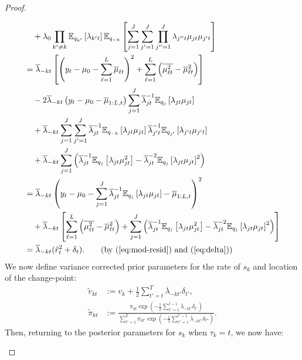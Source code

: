 \begin{proof}
\begin{enumerate}[label=\roman*.]
\begin{align*}
    &\quad + \lambda_0 \prod_{k' \neq k} \E_{q_{k'}}\left[ \lambda_{k't}\right]\E_{q_{-k}}\left[\sum_{j=1}^J\sum_{j'=1}^J  \prod_{j''=1}^J \lambda_{j''t} \mu_{jt} \mu_{j't}\right] \\
    &= \overline{\lambda}_{-kt}\left[\left(y_t - \mu_0 - \sum_{\ell=1}^L \overline{\mu}_{\ell t}\right)^2 + \sum_{\ell=1}^L \left(\overline{\mu^2_{\ell t}} - \overline{\mu}^2_{\ell t} \right) \right] \\
    &\quad -2  \overline{\lambda}_{-kt}\left(y_t - \mu_0  - \overline{\mu}_{1:L, t}\right) \sum_{j=1}^J \overline{\lambda}_{jt}^{-1} \E_{q_{j}}\left[\lambda_{jt} \mu_{jt}\right] \\
    &\quad + \overline{\lambda}_{-kt} \sum_{j=1}^J\sum_{j'=1}^J \overline{\lambda}_{jt}^{-1}\E_{q_{-k}}\left[\lambda_{jt} \mu_{jt}\right]\overline{\lambda}_{j't}^{-1}\E_{q_{j'}}\left[ \lambda_{j't}\mu_{j't}\right] \\
    &\quad + \overline{\lambda}_{-kt} \sum_{j=1}^J\left(\overline{\lambda}_{jt}^{-1}\E_{q_{j}}\left[ \lambda_{jt}\mu_{jt}^2\right] -\overline{\lambda}_{jt}^{-2}\E_{q_{j}}\left[ \lambda_{jt}\mu_{jt}\right]^2\right) \\
    &=  \overline{\lambda}_{-kt}\left(y_t - \mu_0 - \sum_{j=1}^J \overline{\lambda}_{jt}^{-1} \E_{q_{j}}\left[\lambda_{jt} \mu_{jt}\right] - \overline{\mu}_{1:L, t}\right)^2 \\
    &\quad + \overline{\lambda}_{-kt}\left[\sum_{\ell=1}^L \left(\overline{\mu^2_{\ell t}} - \overline{\mu}^2_{\ell t} \right) + \sum_{j=1}^J\left(\overline{\lambda}_{jt}^{-1}\E_{q_{j}}\left[ \lambda_{jt}\mu_{jt}^2\right] -\overline{\lambda}_{jt}^{-2}\E_{q_{j}}\left[ \lambda_{jt}\mu_{jt}\right]^2\right)\right] \\
    &= \overline{\lambda}_{-kt}(\tilde{r}^2_t + \delta_t). \tag{by (\ref{eq:mod-resid}) and (\ref{eq:delta})} 
\end{align*}
\normalsize
We now define variance corrected prior parameters for the rate of $s_{k}$ and location of the change-point:
\begin{align}
    \tilde{v}_{kt} &:= v_k + \frac{1}{2}\sum_{t'=t}^{T}\overline{\lambda}_{-kt'}\delta_{t'}, \label{eq:v-k-corrected} \\
    \tilde{\pi}_{kt} &:= \frac{\pi_{kt} \exp\left(-\frac{1}{2}\sum_{t'=1}^{t-1}\overline{\lambda}_{-kt'}\delta_{t'}\right)}{\sum_{t'=1}^T \pi_{kt'} \exp\left(-\frac{1}{2}\sum_{t''=1}^{t'-1}\overline{\lambda}_{-kt''}\delta_{t''}\right)}. \label{eq:pi-k-corrected}
\end{align}
Then, returning to the posterior parameters for $s_{k}$ when $\tau_{k}=t$, we now have:

\end{enumerate}
\end{proof}
